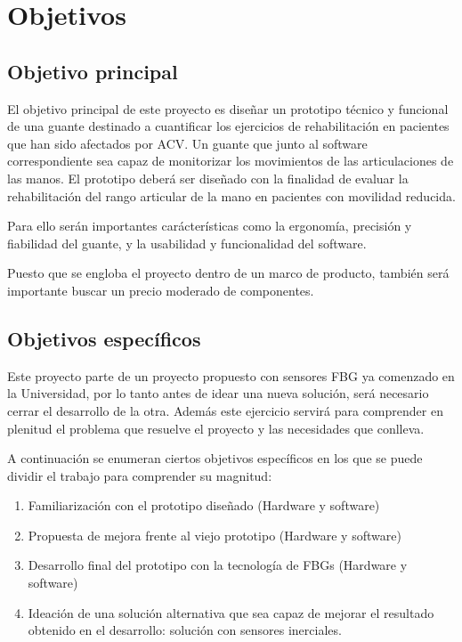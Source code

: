 \section{Objetivos}
\label{sec:objetivos1}
 

\subsection{Objetivo principal}
\label{sec:objPrinc1}

El objetivo principal de este proyecto es diseñar un prototipo técnico y funcional de una guante destinado a cuantificar los ejercicios de rehabilitación en pacientes que han sido afectados por ACV. Un guante que junto al software correspondiente sea capaz de monitorizar los movimientos de las articulaciones de las manos. El prototipo deberá ser diseñado con la finalidad de evaluar la rehabilitación del rango articular de la mano en pacientes con movilidad reducida.

Para ello serán importantes carácterísticas como la ergonomía, precisión y fiabilidad del guante, y la usabilidad y funcionalidad del software. 

Puesto que se engloba el proyecto dentro de un marco de producto, también será importante buscar un precio moderado de componentes.


\subsection{Objetivos específicos}
\label{sec:objEspec1}

Este proyecto parte de un proyecto propuesto con sensores FBG ya comenzado en la Universidad, por lo tanto antes de idear una nueva solución, será necesario cerrar el desarrollo de la otra. Además este ejercicio servirá para comprender en plenitud el problema que resuelve el proyecto y las necesidades que conlleva.

A continuación se enumeran ciertos objetivos específicos en los que se puede dividir el trabajo para comprender su magnitud: 

\begin{enumerate}
	\item Familiarización con el prototipo diseñado (Hardware y software)
	\item Propuesta de mejora frente al viejo prototipo (Hardware y software)
	\item Desarrollo final del prototipo con la tecnología de FBGs (Hardware y software)
	\item Ideación de una solución alternativa que sea capaz de mejorar el resultado obtenido en el desarrollo: solución con sensores inerciales.
	
\end{enumerate}


